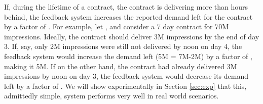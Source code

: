 If, during the lifetime of a contract,  the contract is delivering
more than  hours behind, the feedback system increases the
reported demand left for the contract by a factor of . For
example, let , and consider a 7 day contract for 70M
impressions. Ideally, the contract should deliver 3M impressions by
the end of day 3. If, say, only 2M impressions were still not
delivered by noon on day 4, the feedback system would increase the
demand left (5M = 7M-2M) by a factor of , making it
5M.
 If on the other hand, the contract had already delivered 3M impressions by noon on day 3, the feedback system would decrease
 its demand left by a factor of . We will show experimentally in Section \ref{sec:exp} that this, admittedly simple,
 system performs very well in real world scenarios.
